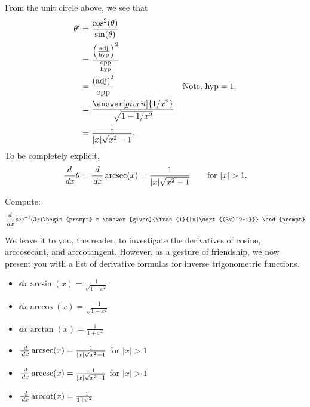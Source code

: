 \documentclass{ximera}
\begin{document}
\begin{theorem}
\begin{explanation}
\begin{image}
\end{image}
From the unit circle above, we see that 
\begin{align*}
  \theta' &= \frac{\cos^2(\theta)}{\sin(\theta)}\\
  &= \frac{
    \left(\frac{\mathrm{adj}}{\mathrm{hyp}}\right)^2}{\frac{\mathrm{opp}}{\mathrm{hyp}}}\\
  &= \frac{\left(\mathrm{adj}\right)^2}{\mathrm{opp}} &\text{Note, $\mathrm{hyp}=1$.}\\
  &= \frac{\answer[given]{1/x^2}}{\sqrt{1-1/x^2}}\\
  &= \frac{1}{|x|\sqrt{x^2-1}},
\end{align*}
To be completely explicit, 
\[
\ddx \theta = \ddx \arcsec(x) = \frac{1}{|x|\sqrt{x^2-1}}\qquad\text{for $|x|>1$}. 
\]
\end{explanation}
\end{theorem}

\begin{question}
  Compute:
  \[
  \ddx \sec^{-1}(3x)
  \begin{prompt}
    = \answer[given]{\frac{1}{|x|\sqrt{(3x)^2-1}}}
  \end{prompt}
  \]
\end{question}

We leave it to you, the reader, to investigate the derivatives of
cosine, arccosecant, and arccotangent. However, as a gesture of
friendship, we now present you with a list of derivative formulas for
inverse trigonometric functions.

\begin{theorem} \hfil
	\begin{itemize}
		\item $\dd{x} \arcsin(x) = \frac{1}{\sqrt{1-x^2}}$
		\item $\dd{x} \arccos(x) = \frac{-1}{\sqrt{1-x^2}}$
		\item $\dd{x} \arctan(x) = \frac{1}{1+x^2}$
		\item $\frac{\,d }{\,d x} \operatorname{arcsec}(x) = \frac{1}{|x|\sqrt{x^2-1}}$ for $|x|>1$
		\item $\frac{\,d }{\,d x} \operatorname{arccsc}(x) = \frac{-1}{|x|\sqrt{x^2-1}}$ for $|x|>1$
		\item $\frac{\,d }{\,d x} \operatorname{arccot}(x) = \frac{-1}{1+x^2}$
	\end{itemize}
\end{theorem}
\end{document}
